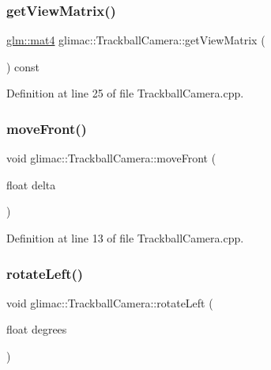 \subsubsection{\texorpdfstring{get\+View\+Matrix()}{getViewMatrix()}}
{\footnotesize\ttfamily \hyperlink{group__core__types_ga7dcd2365c2e368e6af5b7adeb6a9c8df}{glm\+::mat4} glimac\+::\+Trackball\+Camera\+::get\+View\+Matrix (\begin{DoxyParamCaption}{ }\end{DoxyParamCaption}) const}



Definition at line 25 of file Trackball\+Camera.\+cpp.

\mbox{\label{classglimac_1_1_trackball_camera_a78aa452ab479ec1bb9793b46317fcc52}} 
\subsubsection{\texorpdfstring{move\+Front()}{moveFront()}}
{\footnotesize\ttfamily void glimac\+::\+Trackball\+Camera\+::move\+Front (\begin{DoxyParamCaption}\item[{float}]{delta }\end{DoxyParamCaption})}



Definition at line 13 of file Trackball\+Camera.\+cpp.

\mbox{\label{classglimac_1_1_trackball_camera_a88867a2252c47130f90b9dcf6ea0aa44}} 
\subsubsection{\texorpdfstring{rotate\+Left()}{rotateLeft()}}
{\footnotesize\ttfamily void glimac\+::\+Trackball\+Camera\+::rotate\+Left (\begin{DoxyParamCaption}\item[{float}]{degrees }\end{DoxyParamCaption})}



